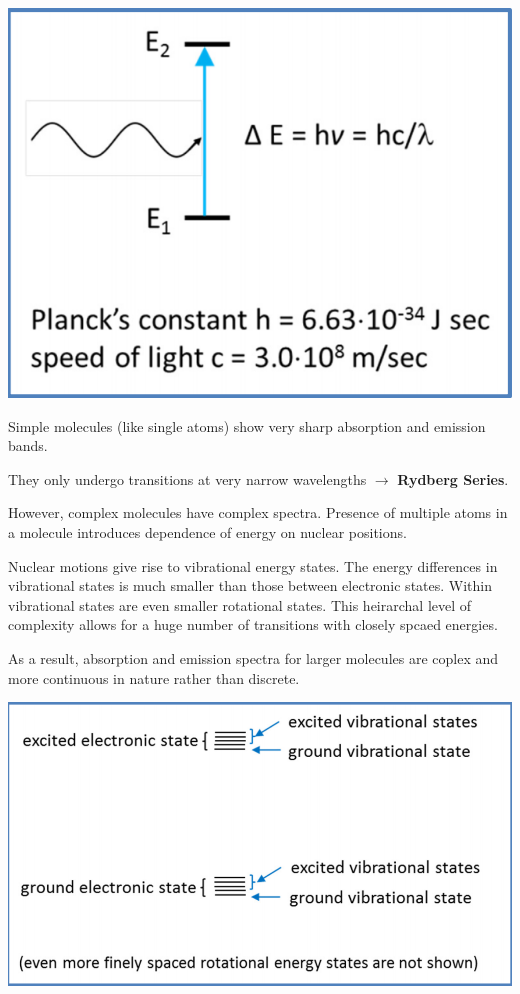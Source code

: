 \documentclass[12pt, letterpaper]{article}
\begin{document}
\begin{center}
    \includegraphics[scale = 0.75]{energy transitions.png}
\end{center}

Simple molecules (like single atoms) show very sharp absorption and emission bands. 

They only undergo transitions at very narrow wavelengths $\longrightarrow$ \textbf{Rydberg Series}. 

However, complex molecules have complex spectra. Presence of multiple atoms in a molecule introduces
dependence of energy on nuclear positions. 

Nuclear motions give rise to vibrational energy states. The energy differences in vibrational states is much 
smaller than those between electronic states. Within vibrational states are even smaller rotational states. 
This heirarchal level of complexity allows for a huge number of transitions with closely spcaed energies. 

As a result, absorption and emission spectra for larger molecules are coplex and more continuous in nature rather than discrete. 

\begin{center}
    \includegraphics[scale = 0.75]{energy states.png}
\end{center}
\end{document}
